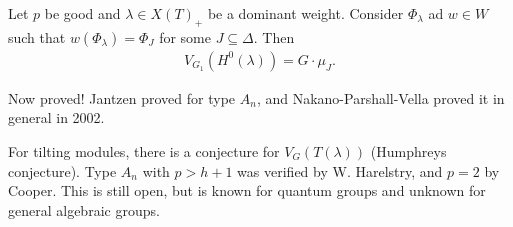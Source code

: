 \begin{conjecture}[Jantzen, 1986]

Let \(p\) be good and \(\lambda \in X(T)_+\) be a dominant weight.
Consider \(\Phi_\lambda\) ad \(w\in W\) such that
\(w(\Phi_\lambda) = \Phi_J\) for some \(J \subseteq \Delta\). Then
\begin{align*}  
V_{G_1} (H^0(\lambda)) = G\cdot \mu_J
.\end{align*}

\end{conjecture}

\begin{remark}

Now proved! Jantzen proved for type \(A_n\), and Nakano-Parshall-Vella
proved it in general in 2002.

\end{remark}

\begin{remark}

For tilting modules, there is a conjecture for \(V_G(T(\lambda))\)
(Humphreys conjecture). Type \(A_n\) with \(p>h+1\) was verified by W.
Harelstry, and \(p=2\) by Cooper. This is still open, but is known for
quantum groups and unknown for general algebraic groups.

\end{remark}

\cleardoublepage

\renewcommand{\listtheoremname}{}
\listoftheorems[ignoreall,show={definition}, numwidth=3.5em]
\cleardoublepage

\renewcommand{\listtheoremname}{}
\listoftheorems[ignoreall,show={theorem,proposition}, numwidth=3.5em]
\cleardoublepage

\renewcommand{\listtheoremname}{}
\listoftheorems[ignoreall,show={exercise}, numwidth=3.5em]
\cleardoublepage

\listoffigures
\cleardoublepage


\printbibliography[title=Bibliography]



